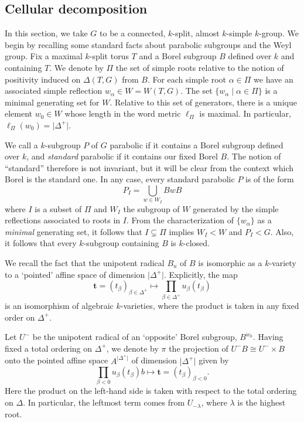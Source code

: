 \documentclass{amsart}
\theoremstyle{plain}
\theoremstyle{definition}
\theoremstyle{remark}
\newcommand{\Vect}[1]{\mathbold{#1}}
\providecommand{\abs}[1]{\lvert#1\rvert}
\begin{document}
\subsection{Cellular decomposition}\label{sec:CellularDecomposition}
In this section, we take $G$ to be a connected, $k$-split, almost $k$-simple
$k$-group. We begin by recalling some standard facts about parabolic subgroups and the Weyl group.
Fix a maximal $k$-split torus $T$ and a Borel subgroup $B$ defined
over $k$ and containing $T$. We denote by $\Pi$ the set of simple roots relative to the
notion of positivity induced on $\Delta(T, G)$ from $B$. For each simple root
$\alpha \in \Pi$ we have an associated simple reflection $w_{\alpha} \in W =W(T,G)$.
The set $\{w_{\alpha} \mid \alpha \in \Pi\}$ is a minimal generating set for $W$. Relative
to this set of generators, there is a unique element $w_{0} \in W$ whose length in the
word metric $\ell_{\Pi}$ is maximal. In particular, $\ell_{\Pi}(w_{0}) = \abs{\Delta^{+}}$.

We call a $k$-subgroup $P$ of $G$ parabolic if it contains a Borel subgroup defined over
$k$, and \emph{standard} parabolic if it contains our fixed Borel $B$. The notion of
``standard'' therefore is not invariant, but it will be clear from the context which Borel
is the standard one. In any case, every standard parabolic $P$ is of the form
\begin{equation}
P_{I} = \bigcup_{w \in W_{I}} BwB\label{doublecosetdecomp}
\end{equation}
where $I$ is a subset of $\Pi$ and $W_{I}$ the subgroup of $W$ generated by the simple
reflections associated to roots in $I$. From the characterization of $\{w_{\alpha}\}$ as
a \emph{minimal} generating set, it follows that $I \subsetneq \Pi$ implies $W_{I} < W$
and $P_{I} < G$. Also, it follows that every $k$-subgroup containing $B$ is $k$-closed.

We recall the fact that the unipotent radical $B_{u}$ of $B$ is isomorphic as a $k$-variety
to a `pointed' affine space of dimension $\abs{\Delta^{+}}$. Explicitly, the map
$$\Vect{t} = (t_{\beta})_{\beta \in \Delta^{+}} \mapsto \prod_{\beta \in \Delta^{+}}
u_{\beta}(t_{\beta})$$
is an isomorphism of algebraic $k$-varieties, where the product is taken in any fixed
order on $\Delta^{+}$.

Let $U^{-}$ be the unipotent radical of an `opposite' Borel subgroup, $B^{\dot{w}_{0}}$. Having fixed a total ordering on $\Delta^{+}$, we denote by $\pi$ the projection of $U^{-}B \cong U^{-} \times B$ onto the pointed affine space $A^{\abs{\Delta^{+}}}$ of dimension $\abs{\Delta^{+}}$ given by
$$\prod_{\beta < 0} u_{\beta}(t_{\beta})b \mapsto \Vect{t} = (t_{\beta})_{\beta < 0}.$$
Here the product on the left-hand side is taken with respect to the total ordering on $\Delta$. In particular, the leftmost term comes from $U_{-\lambda}$, where $\lambda$ is the highest
root.
\end{document}
